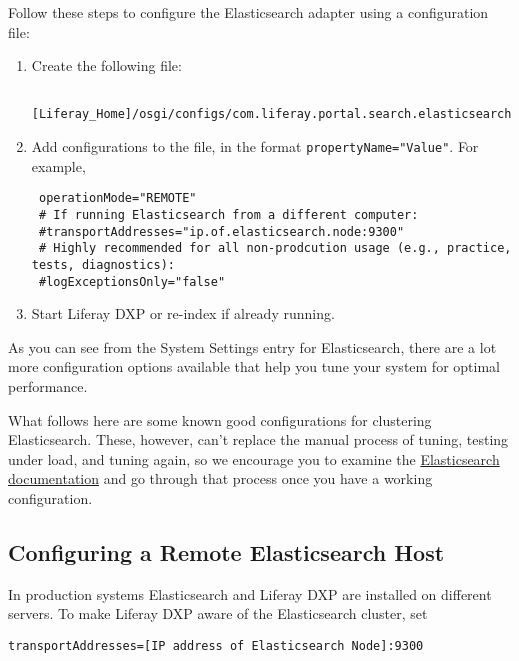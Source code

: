 Follow these steps to configure the Elasticsearch adapter using a
configuration file:

\begin{enumerate}
\def\labelenumi{\arabic{enumi}.}
\item
  Create the following file:

\begin{verbatim}
 [Liferay_Home]/osgi/configs/com.liferay.portal.search.elasticsearch6.configuration.ElasticsearchConfiguration.config
\end{verbatim}
\item
  Add configurations to the file, in the format
  \texttt{propertyName="Value"}. For example,

\begin{verbatim}
 operationMode="REMOTE"
 # If running Elasticsearch from a different computer:
 #transportAddresses="ip.of.elasticsearch.node:9300"
 # Highly recommended for all non-prodcution usage (e.g., practice, tests, diagnostics):
 #logExceptionsOnly="false"
\end{verbatim}
\item
  Start Liferay DXP or re-index if already running.
\end{enumerate}

As you can see from the System Settings entry for Elasticsearch, there
are a lot more configuration options available that help you tune your
system for optimal performance.

What follows here are some known good configurations for clustering
Elasticsearch. These, however, can't replace the manual process of
tuning, testing under load, and tuning again, so we encourage you to
examine the
\href{https://www.elastic.co/guide/en/elasticsearch/reference/6.5/important-settings.html}{Elasticsearch
documentation} and go through that process once you have a working
configuration.

\subsection{Configuring a Remote Elasticsearch
Host}\label{configuring-a-remote-elasticsearch-host}

In production systems Elasticsearch and Liferay DXP are installed on
different servers. To make Liferay DXP aware of the Elasticsearch
cluster, set

\begin{verbatim}
transportAddresses=[IP address of Elasticsearch Node]:9300
\end{verbatim}

